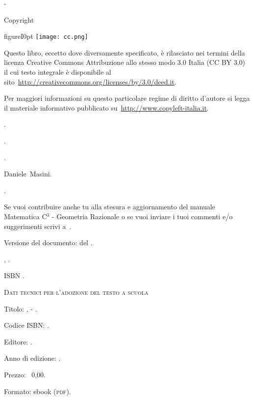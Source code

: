 
\thispagestyle{empty}
{\setlength{\parindent}{0em}\small{
\begin{center}
{\large{\serie{} - \titolo{}}}

Copyright {\textcopyright} \anno{} \editore{}
\end{center}

\begin{wrapfloat}{figure}{I}{0pt}
\texttt{[image: cc.png]}
\end{wrapfloat}

Questo libro, eccetto dove diversamente specificato, è rilasciato nei termini 
della licenza Creative Commons Attribuzione allo stesso modo 3.0 Italia
(CC BY 3.0) il cui testo integrale è disponibile al 
sito~\url{http://creativecommons.org/licenses/by/3.0/deed.it}.

Per maggiori informazioni su questo particolare regime di diritto d'autore si 
legga il materiale informativo pubblicato su~\url{http://www.copyleft-italia.it}.

 {\coord}.

 {\autori}.

 {\colab}.

 {Daniele~Masini}.

 {\texcol}.

 Se vuoi contribuire anche tu alla stesura e aggiornamento 
del manuale Matematica C$^3$ - Geometria Razionale o se  vuoi inviare i tuoi commenti e/o suggerimenti scrivi 
a~.

\vspace{2ex}
 Versione del documento: \docvers{} del \oggi{}.

 \EDIZIONE{}, \mese{} \anno{}.

 ISBN \mcisbn{}.

\vspace{2ex}
 {\scshape{Dati tecnici per l'adozione del testo a scuola}}

 Titolo: \serie, \titolo{} - \edizione{}.

 Codice ISBN: \mcisbn{}.

 Editore: \href{http://www.matematicamente.it}{\editore}. 

 Anno di edizione: \anno{}.

 Prezzo: \officialeuro{}~0,00.

 Formato: ebook (\scshape{pdf}).
}}
\cleardoublepage
